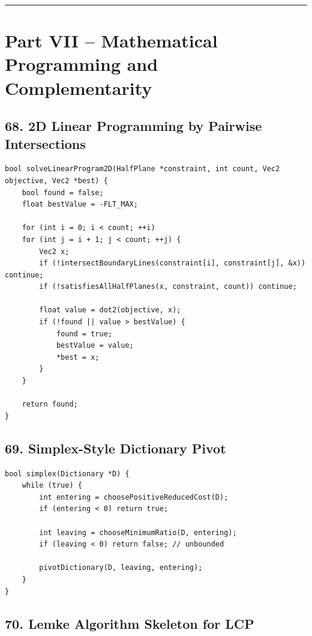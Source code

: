 \documentclass[10pt,letterpaper]{article}
\begin{document}
\medskip\hrule\medskip

\clearpage
\section*{Part VII -- Mathematical Programming and Complementarity}

\subsection*{68. 2D Linear Programming by Pairwise Intersections}

\begin{verbatim}
bool solveLinearProgram2D(HalfPlane *constraint, int count, Vec2 objective, Vec2 *best) {
    bool found = false;
    float bestValue = -FLT_MAX;

    for (int i = 0; i < count; ++i)
    for (int j = i + 1; j < count; ++j) {
        Vec2 x;
        if (!intersectBoundaryLines(constraint[i], constraint[j], &x)) continue;
        if (!satisfiesAllHalfPlanes(x, constraint, count)) continue;

        float value = dot2(objective, x);
        if (!found || value > bestValue) {
            found = true;
            bestValue = value;
            *best = x;
        }
    }

    return found;
}
\end{verbatim}

\subsection*{69. Simplex-Style Dictionary Pivot}

\begin{verbatim}
bool simplex(Dictionary *D) {
    while (true) {
        int entering = choosePositiveReducedCost(D);
        if (entering < 0) return true;

        int leaving = chooseMinimumRatio(D, entering);
        if (leaving < 0) return false; // unbounded

        pivotDictionary(D, leaving, entering);
    }
}
\end{verbatim}

\subsection*{70. Lemke Algorithm Skeleton for LCP}
\end{document}
